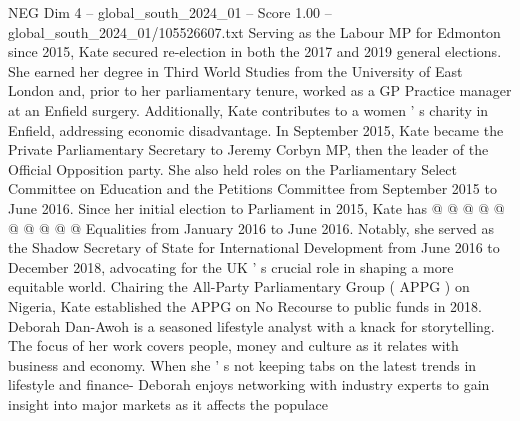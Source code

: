 \begin{textsample}{NEG Dim 4 – global\_south\_2024\_01 – Score 1.00 – global\_south\_2024\_01/105526607.txt}
Serving as the Labour MP for Edmonton since 2015, Kate secured re-election in both the 2017 and 2019 general elections.
She earned her degree in Third World Studies from the University of East London and, prior to her parliamentary tenure, worked as a GP Practice manager at an Enfield surgery.
Additionally, Kate contributes to a women ' s charity in Enfield, addressing economic disadvantage.
In September 2015, Kate became the Private Parliamentary Secretary to Jeremy Corbyn MP, then the leader of the Official Opposition party.
She also held roles on the Parliamentary Select Committee on Education and the Petitions Committee from September 2015 to June 2016.
Since her initial election to Parliament in 2015, Kate has @ @ @ @ @ @ @ @ @ @ Equalities from January 2016 to June 2016.
Notably, she served as the Shadow Secretary of State for International Development from June 2016 to December 2018, advocating for the UK ' s crucial role in shaping a more equitable world.
Chairing the All-Party Parliamentary Group ( APPG ) on Nigeria, Kate established the APPG on No Recourse to public funds in 2018.
Deborah Dan-Awoh is a seasoned lifestyle analyst with a knack for storytelling.
The focus of her work covers people, money and culture as it relates with business and economy.
When she ' s not keeping tabs on the latest trends in lifestyle and finance- Deborah enjoys networking with industry experts to gain insight into major markets as it affects the populace

\end{textsample}
